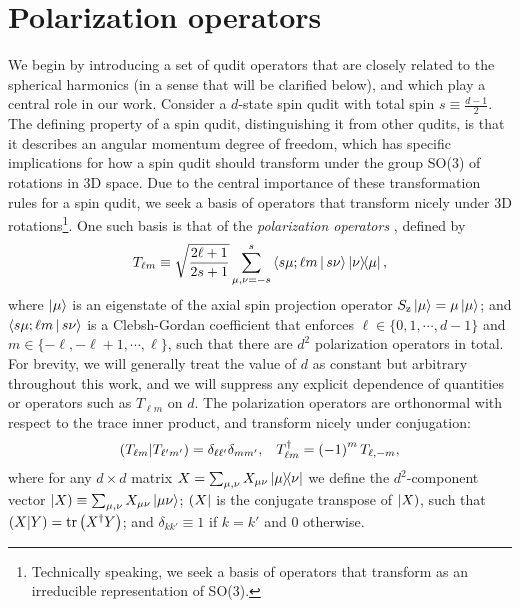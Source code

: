 \documentclass[nofootinbib,twocolumn]{revtex4-1}
\newcommand{\f}[2]{\dfrac{#1}{#2}} %
\newcommand{\p}[1]{\left(#1\right)} %
\newcommand{\bk}{\Braket} %
\renewcommand{\set}[1]{\{#1\}} %
\newcommand{\z}{\text{z}}
\def\obra#1{\mathinner{({#1}|}}
\def\oket#1{\mathinner{|{#1})}}
\def\obk#1{\mathinner{({#1})}}
\begin{document}
\section{Polarization operators}
\label{sec:polarization_ops}

We begin by introducing a set of qudit operators that are closely related to the spherical harmonics (in a sense that will be clarified below), and which play a central role in our work.
Consider a $d$-state spin qudit with total spin $s\equiv\frac{d-1}{2}$.
The defining property of a spin qudit, distinguishing it from other qudits, is that it describes an angular momentum degree of freedom, which has specific implications for how a spin qudit should transform under the group SO(3) of rotations in 3D space.
Due to the central importance of these transformation rules for a spin qudit, we seek a basis of operators that transform nicely under 3D rotations\footnote{Technically speaking, we seek a basis of operators that transform as an irreducible representation of SO(3).}.
One such basis is that of the {\it polarization operators} \cite{kryszewski2006positivity, bertlmann2008bloch}, defined by
\begin{align}
  T_{\ell m} \equiv \sqrt{\f{2\ell+1}{2s+1}} \sum_{\mu,\nu=-s}^s
  \bk{s\mu;\ell m|s\nu} \op{\nu}{\mu},
  \label{eq:trans_op}
\end{align}
where $\ket\mu$ is an eigenstate of the axial spin projection operator $S_\z\ket\mu=\mu\ket\mu$; and $\bk{s\mu;\ell m|s\nu}$ is a Clebsh-Gordan coefficient that enforces $\ell\in\set{0,1,\cdots,d-1}$ and $m\in\set{-\ell,-\ell+1,\cdots,\ell}$, such that there are $d^2$ polarization operators in total.
For brevity, we will generally treat the value of $d$ as constant but arbitrary throughout this work, and we will suppress any explicit dependence of quantities or operators such as $T_{\ell m}$ on $d$.
The polarization operators are orthonormal with respect to the trace inner product, and transform nicely under conjugation:
\begin{align}
  \obk{T_{\ell m }|T_{\ell'm'}}
  = \delta_{\ell\ell'} \delta_{mm'},
  &&
  T_{\ell m}^\dag = \p{-1}^m T_{\ell,-m},
\end{align}
where for any $d\times d$ matrix $X=\sum_{\mu,\nu} X_{\mu\nu} \op{\mu}{\nu}$ we define the $d^2$-component vector $\oket{X} \equiv \sum_{\mu,\nu} X_{\mu\nu} \ket{\mu\nu}$; $\obra{X}$ is the conjugate transpose of $\oket{X}$, such that $\obk{X|Y}=\tr\p{X^\dag Y}$; and $\delta_{kk'}\equiv 1$ if $k=k'$ and $0$ otherwise.
\end{document}
